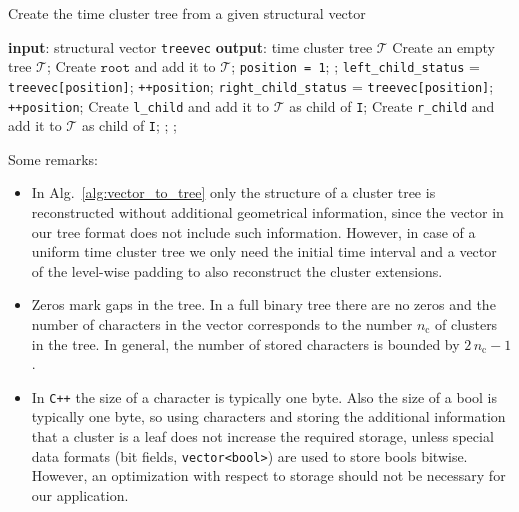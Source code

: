 \documentclass[a4paper,11pt]{article}
\theoremstyle{plain}
\theoremstyle{definition}
\theoremstyle{remark}
\begin{document}
\begin{algorithm}
  \caption{Create the time cluster tree from a given structural vector} \label{alg:vector_to_tree}
  \begin{algorithmic}[1]
    \State \textbf{input}: structural vector \texttt{treevec}
    \State \textbf{output}: time cluster tree $\mathcal{T}$
    \State Create an empty tree $\mathcal{T}$;
      \State Create $\texttt{root}$ and add it to $\mathcal{T}$;
        \State \texttt{position = 1};
        \State {};
      \EndIf
    \EndIf
    \Statex
      \State \texttt{left\_child\_status} = \texttt{treevec[position]};
      \State \texttt{++position};
      \State \texttt{right\_child\_status} = \texttt{treevec[position]};
      \State \texttt{++position};
        \State Create \texttt{l\_child} and add it to $\mathcal{T}$ as child of \texttt{I};
      \EndIf
        \State Create \texttt{r\_child} and add it to $\mathcal{T}$ as child of \texttt{I};
      \EndIf
        \State {};
      \EndIf
        \State {};
      \EndIf
    \EndFunction
  \end{algorithmic}
\end{algorithm}
\newpage
Some remarks:
\begin{itemize}
  \item In Alg.~\ref{alg:vector_to_tree} only the structure of a cluster tree is reconstructed without additional geometrical information, since the vector in our tree format does not include such information. However, in case of a uniform time cluster tree we only need the initial time interval and a vector of the level-wise padding to also reconstruct the cluster extensions.   
  \item Zeros mark gaps in the tree. In a full binary tree there are no zeros and the number of characters in the vector corresponds to the number $n_\mathrm{c}$ of clusters in the tree. In general, the number of stored characters is bounded by $2\,n_\mathrm{c}-1$.
  \item In \texttt{C++} the size of a character is typically one byte. Also the size of a bool is typically one byte, so using characters and storing the additional information that a cluster is a leaf does not increase the required storage, unless special data formats (bit fields, \texttt{vector<bool>}) are used to store bools bitwise. However, an optimization with respect to storage should not be necessary for our application.
\end{itemize}
\end{document}
